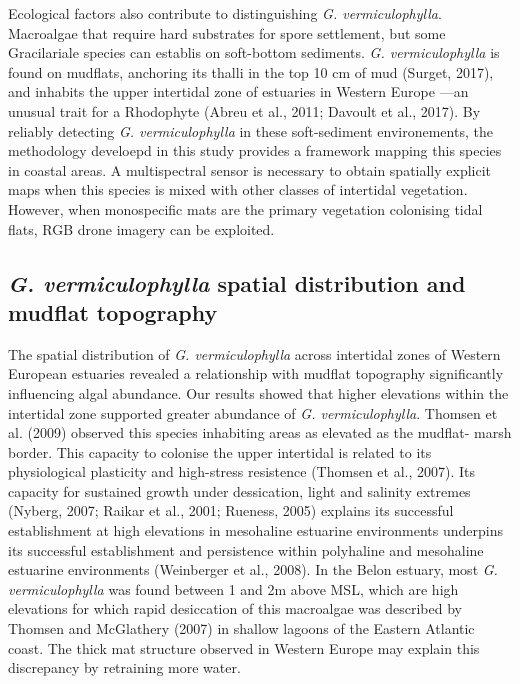 \documentclass[
  letterpaper,
  11pt,
  english,
  singlespacing,
  headsepline]{MastersDoctoralThesis}
\begin{document}
\begin{spacing}{1.5}
Ecological factors also contribute to distinguishing \emph{G.
vermiculophylla}. Macroalgae that require hard substrates for spore
settlement, but some Gracilariale species can establis on soft-bottom
sediments. \emph{G. vermiculophylla} is found on mudflats, anchoring its
thalli in the top 10 cm of mud (Surget, 2017), and inhabits the upper
intertidal zone of estuaries in Western Europe ---an unusual trait for a
Rhodophyte (Abreu et al., 2011; Davoult et al., 2017). By reliably
detecting \emph{G. vermiculophylla} in these soft-sediment
environements, the methodology develoepd in this study provides a
framework mapping this species in coastal areas. A multispectral sensor
is necessary to obtain spatially explicit maps when this species is
mixed with other classes of intertidal vegetation. However, when
monospecific mats are the primary vegetation colonising tidal flats, RGB
drone imagery can be exploited.

\subsection{\texorpdfstring{\emph{G. vermiculophylla} spatial
distribution and mudflat
topography}{G. vermiculophylla spatial distribution and mudflat topography}}\label{g.-vermiculophylla-spatial-distribution-and-mudflat-topography}

The spatial distribution of \emph{G. vermiculophylla} across intertidal
zones of Western European estuaries revealed a relationship with mudflat
topography significantly influencing algal abundance. Our results showed
that higher elevations within the intertidal zone supported greater
abundance of \emph{G. vermiculophylla}. Thomsen et al. (2009) observed
this species inhabiting areas as elevated as the mudflat- marsh border.
This capacity to colonise the upper intertidal is related to its
physiological plasticity and high-stress resistence (Thomsen et al.,
2007). Its capacity for sustained growth under dessication, light and
salinity extremes (Nyberg, 2007; Raikar et al., 2001; Rueness, 2005)
explains its successful establishment at high elevations in mesohaline
estuarine environments underpins its successful establishment and
persistence within polyhaline and mesohaline estuarine environments
(Weinberger et al., 2008). In the Belon estuary, most \emph{G.
vermiculophylla} was found between 1 and 2m above MSL, which are high
elevations for which rapid desiccation of this macroalgae was described
by Thomsen and McGlathery (2007) in shallow lagoons of the Eastern
Atlantic coast. The thick mat structure observed in Western Europe may
explain this discrepancy by retraining more water.


\end{spacing}
\end{document}
